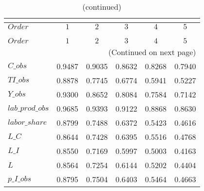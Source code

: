  
\begin{center}
\begin{longtable}{lccccc} 
\caption{COEFFICIENTS OF AUTOCORRELATION}\\
 \label{Table:th_autocorr_matrix}\\
\toprule 
$Order           $	 & 	 $         1$	 & 	 $         2$	 & 	 $         3$	 & 	 $         4$	 & 	 $         5$\\
\midrule \endfirsthead 
\caption{(continued)}\\
 \toprule \\ 
$Order           $	 & 	 $         1$	 & 	 $         2$	 & 	 $         3$	 & 	 $         4$	 & 	 $         5$\\
\midrule \endhead 
\midrule \multicolumn{6}{r}{(Continued on next page)} \\ \bottomrule \endfoot 
\bottomrule \endlastfoot 
$C\_obs          $	 & 	    0.9487	 & 	    0.9035	 & 	    0.8632	 & 	    0.8268	 & 	    0.7940 \\ 
$TI\_obs         $	 & 	    0.8878	 & 	    0.7745	 & 	    0.6774	 & 	    0.5941	 & 	    0.5227 \\ 
$Y\_obs          $	 & 	    0.9300	 & 	    0.8652	 & 	    0.8084	 & 	    0.7584	 & 	    0.7142 \\ 
$lab\_prod\_obs  $	 & 	    0.9685	 & 	    0.9393	 & 	    0.9122	 & 	    0.8868	 & 	    0.8630 \\ 
$labor\_share    $	 & 	    0.8799	 & 	    0.7488	 & 	    0.6372	 & 	    0.5423	 & 	    0.4616 \\ 
$L\_C            $	 & 	    0.8644	 & 	    0.7428	 & 	    0.6395	 & 	    0.5516	 & 	    0.4768 \\ 
$L\_I            $	 & 	    0.8550	 & 	    0.7169	 & 	    0.5997	 & 	    0.5003	 & 	    0.4163 \\ 
$L               $	 & 	    0.8564	 & 	    0.7254	 & 	    0.6144	 & 	    0.5202	 & 	    0.4404 \\ 
$p\_I\_obs       $	 & 	    0.8795	 & 	    0.7504	 & 	    0.6403	 & 	    0.5464	 & 	    0.4663 \\ 
\end{longtable}
 \end{center}
